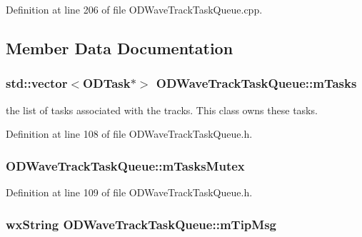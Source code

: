 Definition at line 206 of file O\+D\+Wave\+Track\+Task\+Queue.\+cpp.



\subsection{Member Data Documentation}
\subsubsection[{\texorpdfstring{m\+Tasks}{mTasks}}]{\setlength{\rightskip}{0pt plus 5cm}std\+::vector$<${\bf O\+D\+Task}$\ast$$>$ O\+D\+Wave\+Track\+Task\+Queue\+::m\+Tasks\hspace{0.3cm}{\ttfamily [protected]}}\hypertarget{class_o_d_wave_track_task_queue_ac588566fcb4c38b49e2bd29f78ad92fb}{}\label{class_o_d_wave_track_task_queue_ac588566fcb4c38b49e2bd29f78ad92fb}


the list of tasks associated with the tracks. This class owns these tasks. 



Definition at line 108 of file O\+D\+Wave\+Track\+Task\+Queue.\+h.

\subsubsection[{\texorpdfstring{m\+Tasks\+Mutex}{mTasksMutex}}]{ O\+D\+Wave\+Track\+Task\+Queue\+::m\+Tasks\+Mutex\hspace{0.3cm}{\ttfamily [protected]}}\hypertarget{class_o_d_wave_track_task_queue_a330f304c94aeca1402d1bfe1cc2870fa}{}\label{class_o_d_wave_track_task_queue_a330f304c94aeca1402d1bfe1cc2870fa}


Definition at line 109 of file O\+D\+Wave\+Track\+Task\+Queue.\+h.

\subsubsection[{\texorpdfstring{m\+Tip\+Msg}{mTipMsg}}]{\setlength{\rightskip}{0pt plus 5cm}wx\+String O\+D\+Wave\+Track\+Task\+Queue\+::m\+Tip\+Msg\hspace{0.3cm}{\ttfamily [protected]}}\hypertarget{class_o_d_wave_track_task_queue_a19654517cedf1ee7b271dc543e439ea1}{}\label{class_o_d_wave_track_task_queue_a19654517cedf1ee7b271dc543e439ea1}


